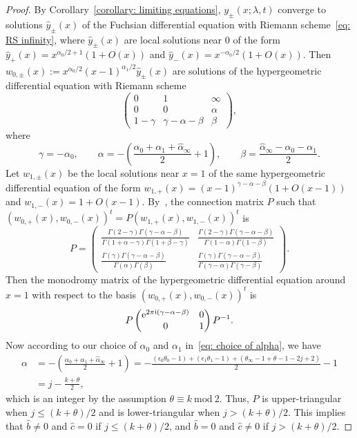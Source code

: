 \documentclass[10pt,a4paper]{amsart}
\numberwithin{equation}{section}
\def\mod{\ \mathrm{mod}\ }
\def\M#1#2#3#4{\begin{pmatrix}#1&#2\\#3&#4\end{pmatrix}}
\begin{document}
\begin{proof} By Corollary~\ref{corollary: limiting equations},
 $y_\pm(x;\lambda,t)$ converge to solutions $\hat y_\pm(x)$ of the
 Fuchsian differential equation with Riemann scheme~\eqref{eq: RS
 infinity}, where $\hat y_\pm(x)$ are local solutions near $0$ of
 the form $\hat y_+(x)=x^{\alpha_0/2+1}(1+O(x))$ and $\hat
 y_-(x)=x^{-\alpha_0/2}(1+O(x))$. Then
 $w_{0,\pm}(x):=x^{\alpha_0/2}(x-1)^{\alpha_1/2}\hat
 y_\pm(x)$ are solutions of the hypergeometric differential equation
 with Riemann scheme
\[
 \begin{pmatrix} 0 & 1 & \infty \\
 0 & 0 & \alpha \\
 1-\gamma & \gamma-\alpha-\beta & \beta\end{pmatrix},
\]
 where
\[
 \gamma=-\alpha_0, \qquad
 \alpha=-\left(\frac{\alpha_0+\alpha_1+\hat\alpha_\infty}2+1\right),
 \qquad
 \beta=\frac{\hat\alpha_\infty-\alpha_0-\alpha_1}2.
\]
 Let $w_{1,\pm}(x)$ be the local solutions near $x=1$ of the same
 hypergeometric differential equation of the form
 $w_{1,+}(x)=(x-1)^{\gamma-\alpha-\beta}(1+O(x-1))$ and
 $w_{1,-}(x)=1+O(x-1)$. By~\cite[Chapter~2, Theorem~4.7.1]{Yoshida}, the connection matrix $P$ such that
 $(w_{0,+}(x),w_{0,-}(x))^t=P{(w_{1,+}(x),w_{1,-}(x))^t}$ is
\[
 P=\begin{pmatrix}
 \displaystyle
 \frac{\Gamma(2-\gamma)\Gamma(\gamma-\alpha-\beta)}
 {\Gamma(1+\alpha-\gamma)\Gamma(1+\beta-\gamma)} &
 \displaystyle
 \frac{\Gamma(2-\gamma)\Gamma(\gamma-\alpha-\beta)}
 {\Gamma(1-\alpha)\Gamma(1-\beta)} \\[10pt]
 \displaystyle
 \frac{\Gamma(\gamma)\Gamma(\gamma-\alpha-\beta)}
 {\Gamma(\alpha)\Gamma(\beta)} &
 \displaystyle\frac{\Gamma(\gamma)\Gamma(\gamma-\alpha-\beta)}
 {\Gamma(\gamma-\alpha)\Gamma(\gamma-\beta)} \end{pmatrix}.
\]
 Then the monodromy matrix of the hypergeometric differential
 equation around $x=1$ with respect to the basis
 $(w_{0,+}(x),w_{0,-}(x))^t$ is
\[
 P\M{{\rm e}^{2\pi {\rm i}(\gamma-\alpha-\beta)}}001P^{-1}.
\]
 Now according to our choice of $\alpha_0$ and $\alpha_1$ in~\eqref{eq: choice of alpha}, we have
 \begin{align*}
 \alpha&{}=-\left(\frac{\alpha_0+\alpha_1+\hat\alpha_\infty}2
 +1\right)
=-\frac{(\epsilon_0\theta_0-1)+(\epsilon_1\theta_1-1)
 +(\theta_\infty-1+\theta-1-2j+2)}2-1 \\
 &{}=j-\frac{k+\theta}2,
 \end{align*}
 which is an integer by the assumption $\theta\equiv k\mod 2$.
 Thus, $P$ is upper-triangular when $j\le(k+\theta)/2$ and is
 lower-triangular when $j>(k+\theta)/2$. This implies that $\hat
 b\neq0$ and $\hat c=0$ if $j\le(k+\theta)/2$, and $\hat b=0$ and
 $\hat c\neq 0$ if $j>(k+\theta)/2$.
\end{proof}
\end{document}
